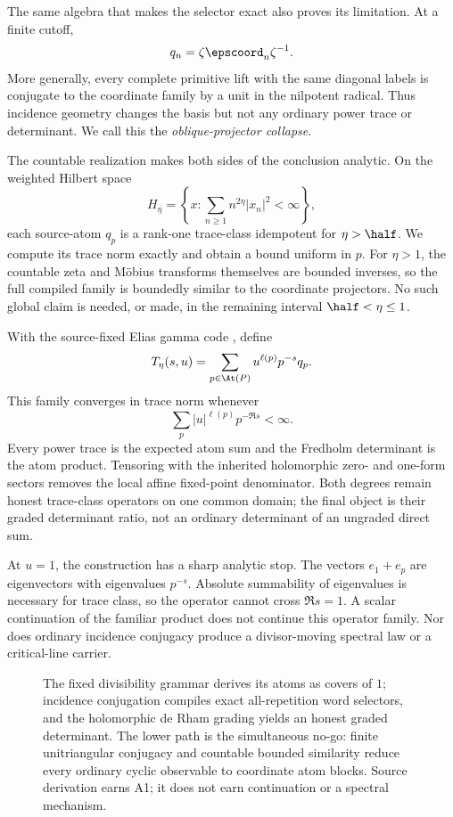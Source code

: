 The same algebra that makes the selector exact also proves its limitation.
At a finite cutoff,
\begin{equation}
q_n=\zeta\epscoord_n\zeta^{-1}.
\label{eq:intro-similarity}
\end{equation}
More generally, every complete primitive lift with the same diagonal labels
is conjugate to the coordinate family by a unit in the nilpotent radical.
Thus incidence geometry changes the basis but not any ordinary power trace or
determinant. We call this the \emph{oblique-projector collapse}.

The countable realization makes both sides of the conclusion analytic. On
the weighted Hilbert space
\[
H_\eta=\left\{x:\sum_{n\ge1}n^{2\eta}|x_n|^2<\infty\right\},
\]
each source-atom \(q_p\) is a rank-one trace-class idempotent for
\(\eta>\half\). We compute its trace norm exactly and obtain a bound uniform
in \(p\). For \(\eta>1\), the countable zeta and Möbius transforms themselves
are bounded inverses, so the full compiled family is boundedly similar to the
coordinate projectors. No such global claim is needed, or made, in the
remaining interval \(\half<\eta\le1\).

With the source-fixed Elias gamma code \citep{elias1975universal}, define
\[
T_\eta(s,u)=\sum_{p\in\At(P)}
u^{\ell(p)}p^{-s}q_p.
\]
This family converges in trace norm whenever
\[
\sum_p|u|^{\ell(p)}p^{-\Re s}<\infty.
\]
Every power trace is the expected atom sum and the Fredholm determinant is
the atom product. Tensoring with the inherited holomorphic zero- and one-form
sectors removes the local affine fixed-point denominator. Both degrees remain
honest trace-class operators on one common domain; the final object is their
graded determinant ratio, not an ordinary determinant of an ungraded direct
sum.

At \(u=1\), the construction has a sharp analytic stop. The vectors
\(e_1+e_p\) are eigenvectors with eigenvalues \(p^{-s}\). Absolute
summability of eigenvalues is necessary for trace class, so the operator
cannot cross \(\Re s=1\). A scalar continuation of the familiar product does
not continue this operator family. Nor does ordinary incidence conjugacy
produce a divisor-moving spectral law or a critical-line carrier.

\begin{figure}[t]
\centering
\resizebox{\textwidth}{!}{}
\caption{The fixed divisibility grammar derives its atoms as covers of \(1\);
incidence conjugation compiles exact all-repetition word selectors, and the
holomorphic de Rham grading yields an honest graded determinant. The lower
path is the simultaneous no-go: finite unitriangular conjugacy and countable
bounded similarity reduce every ordinary cyclic observable to coordinate
atom blocks. Source derivation earns A1; it does not earn continuation or a
spectral mechanism.}
\label{fig:source-pipeline}
\end{figure}

